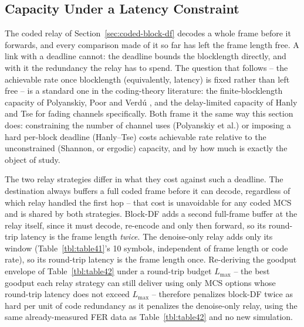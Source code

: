 \subsection{Capacity Under a Latency Constraint}\label{sec:coded-latency-capacity}

The coded relay of Section~\ref{sec:coded-block-df} decodes a whole frame before it forwards, and every comparison made of it so far has left the frame length free. A link with a deadline cannot: the deadline bounds the blocklength directly, and with it the redundancy the relay has to spend. The question that follows -- the achievable rate once blocklength (equivalently, latency) is fixed rather than left free -- is a standard one in the coding-theory literature: the finite-blocklength capacity of Polyanskiy, Poor and Verd\'{u} \cite{PolyanskiyPoorVerdu2010FiniteBlocklength}, and the delay-limited capacity of Hanly and Tse \cite{HanlyTse1998DelayLimited} for fading channels specifically. Both frame it the same way this section does: constraining the number of channel uses (Polyanskiy et al.) or imposing a hard per-block deadline (Hanly--Tse) costs achievable rate relative to the unconstrained (Shannon, or ergodic) capacity, and by how much is exactly the object of study.

The two relay strategies differ in what they cost against such a deadline. The destination always buffers a full coded frame before it can decode, regardless of which relay handled the first hop -- that cost is unavoidable for any coded MCS and is shared by both strategies. Block-DF adds a second full-frame buffer at the relay itself, since it must decode, re-encode and only then forward, so its round-trip latency is the frame length \emph{twice}. The denoise-only relay adds only its window (Table~\ref{tbl:table41}'s 10 symbols, independent of frame length or code rate), so its round-trip latency is the frame length once. Re-deriving the goodput envelope of Table~\ref{tbl:table42} under a round-trip budget $L_{\max}$ -- the best goodput each relay strategy can still deliver using only MCS options whose round-trip latency does not exceed $L_{\max}$ -- therefore penalizes block-DF twice as hard per unit of code redundancy as it penalizes the denoise-only relay, using the same already-measured FER data as Table~\ref{tbl:table42} and no new simulation.

